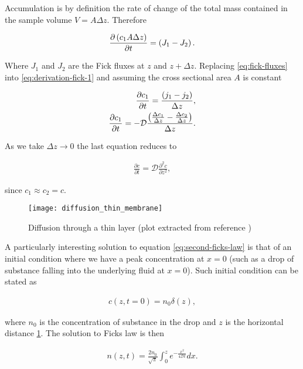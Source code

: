 Accumulation is by definition the rate of change of the total mass contained in the sample volume $V = A\Delta z$. Therefore

\begin{align}
	\label{eq:derivation-fick-1}
	\frac{\partial \left({c_1 A\Delta z}\right)}{\partial t} = \left({J_1 - J_2}\right).
\end{align}

Where $J_1$ and $J_2$ are the Fick fluxes at $z$ and $z+\Delta z$. Replacing \ref{eq:fick-fluxes} into \ref{eq:derivation-fick-1} and assuming the cross sectional area $A$ is constant

\begin{align}
	\frac{\partial c_1}{\partial t} = \frac{\left({j_1 - j_2}\right)}{\Delta z},\\
	\frac{\partial c_1}{\partial t} = -\mathcal{D}\frac{\left({\frac{\Delta c_1}{\Delta z} - \frac{\Delta c_2}{\Delta z}}\right)}{\Delta z}.
\end{align}

As we take $\Delta z \rightarrow 0$ the last equation reduces to

\begin{align}
\label{eq:second-ficks-law}
	\frac{\partial c}{\partial t} = \mathcal{D}\frac{\partial^2 c}{\partial z^2},
\end{align}

since $c_1\approx c_2 = c$.
\begin{figure}[h!]
\centering
	\texttt{[image: diffusion\_thin\_membrane]}
	\caption{Diffusion through a thin layer (plot extracted from reference \cite{cussler})}
\label{fig:cussler_thin_layer}
\end{figure}




A particularly interesting solution to equation \ref{eq:second-ficks-law} is that of an initial condition where we have a peak concentration at $x=0$ (such as a drop of substance falling into the underlying fluid at $x=0$). Such initial condition can be stated as

\begin{align}
	c(z,t=0) = n_0 \delta(z),
\end{align}

where $n_0$ is the concentration of substance in the drop and $z$ is the horizontal distance \ref{fig:cussler_thin_layer}. The solution to Ficks law is then

\begin{align}
	\label{eq:solution-fick}
	n(z,t) = \frac{2n_0}{\sqrt{\pi}}\int_0^z e^{-\frac{x^2}{4\mathcal{D}t}}dx.
\end{align}






